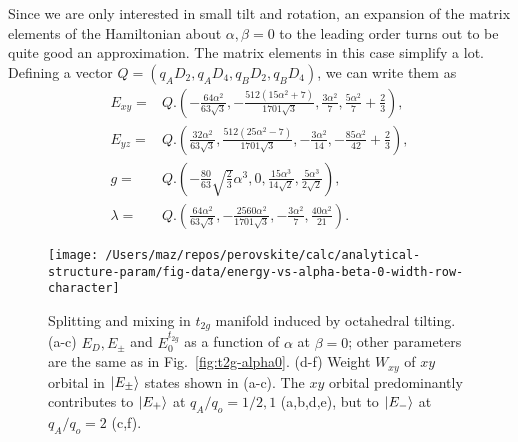 \documentclass[a4paper,prb,twocolumn]{revtex4-1}  %
\begin{document}
Since we are only interested in small tilt and rotation,
an expansion of the matrix elements of the Hamiltonian about 
${\alpha,\beta=0}$
to the leading order turns out to be quite good an approximation.
The matrix elements in this case simplify a lot.
Defining a vector ${Q = \left( q_A D_2, q_A D_4, q_B D_2,q_B D_4  \right)}$,
 we can write them as
\begin{align}
E_{xy}=& Q.
\left(-\frac{64 \alpha ^2}{63 \sqrt{3}},-\frac{512 \left(15 \alpha ^2+7\right)}{1701 \sqrt{3}},\frac{3\alpha ^2}{7} ,\frac{5 \alpha ^2}{7}+\frac{2}{3}\right),\\
E_{yz}=& Q.
\left(\frac{32 \alpha ^2}{63 \sqrt{3}},\frac{512 \left(25 \alpha ^2-7\right)}{1701 \sqrt{3}},-\frac{3 \alpha ^2}{14},-\frac{85 \alpha ^2}{42}+\frac{2}{3}\right),\\
g=& Q.
\left(-\frac{80}{63} \sqrt{\frac{2}{3}} \alpha ^3,0,\frac{15 \alpha ^3}{14 \sqrt{2}},\frac{5 \alpha ^3}{2 \sqrt{2}}\right),\\
\lambda=& Q.
\left(\frac{64 \alpha ^2}{63 \sqrt{3}},-\frac{2560 \alpha ^2}{1701 \sqrt{3}},-\frac{3 \alpha ^2}{7},\frac{40 \alpha ^2}{21}\right).
\end{align}





\begin{figure}[htbp]
\begin{center}
\texttt{[image: /Users/maz/repos/perovskite/calc/analytical-structure-param/fig-data/energy-vs-alpha-beta-0-width-row-character]}
\caption{
Splitting and mixing in $t_{2g}$ manifold induced by octahedral tilting.
(a-c) 
$E_D, E_{\pm}$ and $E_0^{t_{2g}}$
as a function of $\alpha$
at 
$\beta=0$;
other parameters are the same as in Fig.~\ref{fig:t2g-alpha0}.
(d-f) Weight $W_{xy}$ of $xy$ orbital in 
$\ket{E_{\pm}}$ states 
shown in (a-c).
The $xy$ orbital predominantly
contributes to 
$\ket{E_{+}}$
at $q_A/q_o=1/2,1$ (a,b,d,e), 
but to   
$\ket{E_{-}}$
at $q_A/q_o=2$ (c,f).
}
\label{fig:t2g-beta0}
\end{center}
\end{figure}
\end{document}
